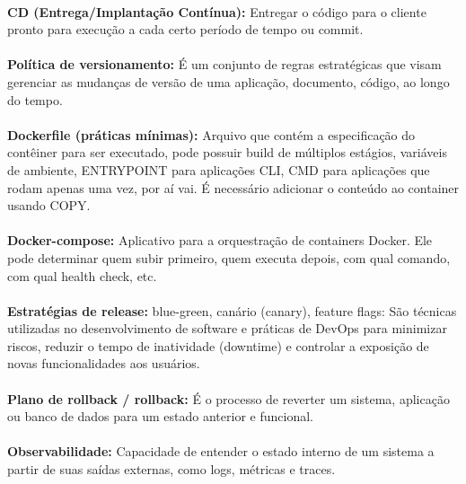 \documentclass{article}
\begin{document}
\paragraph{}
\textbf{CD (Entrega/Implantação Contínua):} Entregar o código para o cliente pronto para execução a cada certo período de tempo ou commit.

\paragraph{}
\textbf{Política de versionamento:} É um conjunto de regras estratégicas que visam gerenciar as mudanças de versão de uma aplicação, documento, código, ao longo do tempo.

\paragraph{}
\textbf{Dockerfile (práticas mínimas):} Arquivo que contém a especificação do contêiner para ser executado, pode possuir build de múltiplos estágios, variáveis de ambiente, ENTRYPOINT para aplicações CLI, CMD para aplicações que rodam apenas uma vez, por aí vai. É necessário adicionar o conteúdo ao container usando COPY.

\paragraph{}
\textbf{Docker-compose:} Aplicativo para a orquestração de containers Docker. Ele pode determinar quem subir primeiro, quem executa depois, com qual comando, com qual health check, etc.

\paragraph{}
\textbf{Estratégias de release:} blue-green, canário (canary), feature flags: São técnicas utilizadas no desenvolvimento de software e práticas de DevOps para minimizar riscos, reduzir o tempo de inatividade (downtime) e controlar a exposição de novas funcionalidades aos usuários.

\paragraph{}
\textbf{Plano de rollback / rollback:} É o processo de reverter um sistema, aplicação ou banco de dados para um estado anterior e funcional.

\paragraph{}
\textbf{Observabilidade:} Capacidade de entender o estado interno de um sistema a partir de suas saídas externas, como logs, métricas e traces.
\end{document}
